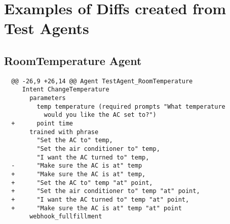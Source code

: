 \chapter{Examples of Diffs created from Test Agents}

\section{RoomTemperature Agent}
\label{RoomTemperature Agent DSLDiff}

\begin{lstlisting}
  @@ -26,9 +26,14 @@ Agent TestAgent_RoomTemperature
     Intent ChangeTemperature
       parameters 
         temp temperature (required prompts "What temperature 
           would you like the AC set to?")
  +      point time
       trained with phrase 
         "Set the AC to" temp, 
         "Set the air conditioner to" temp, 
         "I want the AC turned to" temp, 
  -      "Make sure the AC is at" temp
  +      "Make sure the AC is at" temp,
  +      "Set the AC to" temp "at" point, 
  +      "Set the air conditioner to" temp "at" point,
  +      "I want the AC turned to" temp "at" point,
  +      "Make sure the AC is at" temp "at" point
       webhook_fullfillment
\end{lstlisting}

\pagebreak